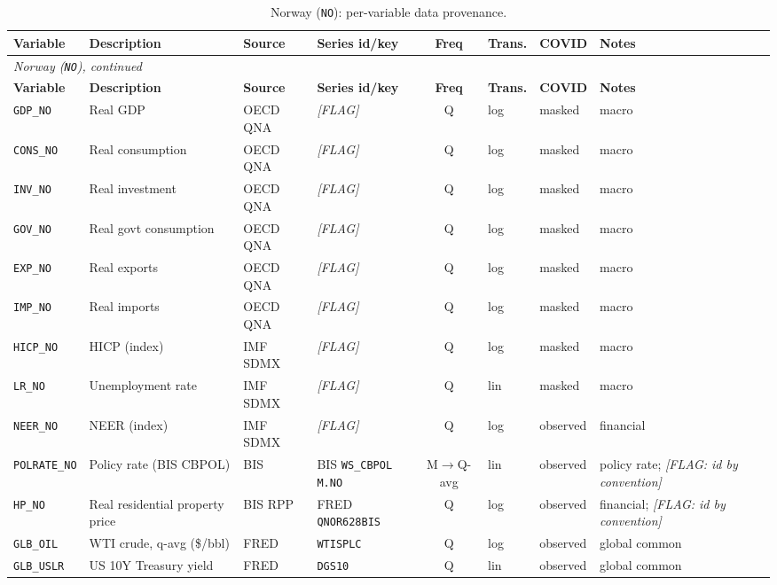 {\small
\begin{longtable}{@{}lp{2.9cm}p{1.9cm}p{2.0cm}cp{1.4cm}p{1.7cm}p{2.6cm}@{}}
\caption{Norway (\texttt{NO}): per-variable data provenance.}\label{tab:data:NO}\\
\toprule
\textbf{Variable} & \textbf{Description} & \textbf{Source} & \textbf{Series id/key} & \textbf{Freq} & \textbf{Trans.} & \textbf{COVID} & \textbf{Notes}\\
\midrule
\endfirsthead
\multicolumn{8}{l}{\small\itshape Norway (\texttt{NO}), continued}\\
\toprule
\textbf{Variable} & \textbf{Description} & \textbf{Source} & \textbf{Series id/key} & \textbf{Freq} & \textbf{Trans.} & \textbf{COVID} & \textbf{Notes}\\
\midrule
\endhead
\bottomrule
\endfoot
\texttt{GDP\_NO} & Real GDP & OECD QNA & \textit{[FLAG]} & Q & log & masked & macro\\
\texttt{CONS\_NO} & Real consumption & OECD QNA & \textit{[FLAG]} & Q & log & masked & macro\\
\texttt{INV\_NO} & Real investment & OECD QNA & \textit{[FLAG]} & Q & log & masked & macro\\
\texttt{GOV\_NO} & Real govt consumption & OECD QNA & \textit{[FLAG]} & Q & log & masked & macro\\
\texttt{EXP\_NO} & Real exports & OECD QNA & \textit{[FLAG]} & Q & log & masked & macro\\
\texttt{IMP\_NO} & Real imports & OECD QNA & \textit{[FLAG]} & Q & log & masked & macro\\
\texttt{HICP\_NO} & HICP (index) & IMF SDMX & \textit{[FLAG]} & Q & log & masked & macro\\
\texttt{LR\_NO} & Unemployment rate & IMF SDMX & \textit{[FLAG]} & Q & lin & masked & macro\\
\texttt{NEER\_NO} & NEER (index) & IMF SDMX & \textit{[FLAG]} & Q & log & observed & financial\\
\texttt{POLRATE\_NO} & Policy rate (BIS CBPOL) & BIS & BIS \texttt{WS\_CBPOL} \texttt{M.NO} & M$\to$Q-avg & lin & observed & policy rate; \textit{[FLAG: id by convention]}\\
\texttt{HP\_NO} & Real residential property price & BIS RPP & FRED \texttt{QNOR628BIS} & Q & log & observed & financial; \textit{[FLAG: id by convention]}\\
\texttt{GLB\_OIL} & WTI crude, q-avg (\$/bbl) & FRED & \texttt{WTISPLC} & Q & log & observed & global common\\
\texttt{GLB\_USLR} & US 10Y Treasury yield & FRED & \texttt{DGS10} & Q & lin & observed & global common\\

\end{longtable}}
